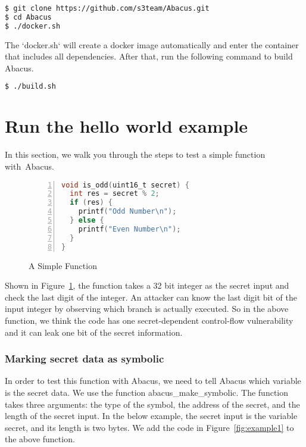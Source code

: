 \documentclass[10pt,conference]{IEEEtran}
\newcommand{\tool}{\textsf{Abacus}}
\begin{document}
\begin{lstlisting}[language=bash]
$ git clone https://github.com/s3team/Abacus.git
$ cd Abacus
$ ./docker.sh
\end{lstlisting}

The `docker.sh` will create a docker image automatically and enter the container that includes all dependencies. After that, run the following command to build Abacus.

\begin{lstlisting}[language=bash]
$ ./build.sh
\end{lstlisting}
\section{Run the hello world example}
In this section, we walk you through the steps to test a simple function with~\tool{}.

\begin{figure}[h]
\begin{lstlisting}[xleftmargin=.06\textwidth, xrightmargin=.06\textwidth,numbers=left, frame=single, language=C]
void is_odd(uint16_t secret) {
  int res = secret % 2;        
  if (res) {             
    printf("Odd Number\n");
  } else {
    printf("Even Number\n");
  }
}
\end{lstlisting}
\caption{A Simple Function}
\label{fig:example0}
\end{figure}

Shown in Figure~\ref{fig:example0}, the function takes a 32 bit integer as the secret input and check the last digit of the integer. An attacker can know the last digit bit of the input integer by observing which branch is actually executed. So in the above function, we think the code has one secret-dependent control-flow vulnerability and it can leak one bit of the secret information.

\subsubsection{Marking secret data as symbolic}
In order to test this function with Abacus, we need to tell Abacus which variable is the secret data. We use the function \textsf{abacus\_make\_symbolic}. The function takes three arguments: the type of the symbol, the address of the secret, and the length of the secret input. In the below example, the secret input is the variable secret, and its length is two bytes. We add the code in Figure~\ref{fig:example1} to the above function.
\end{document}
